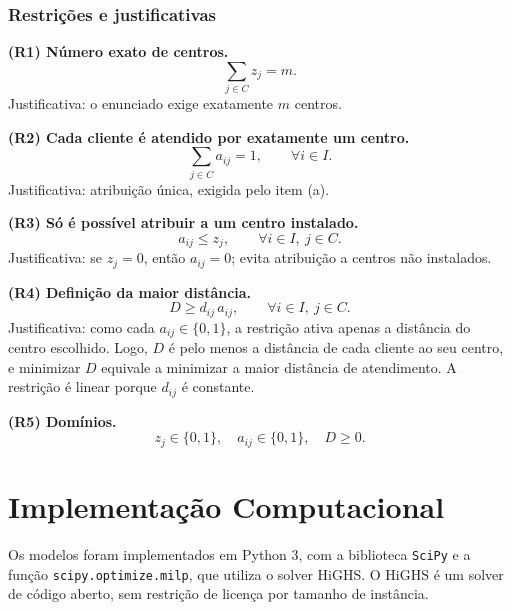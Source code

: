 \documentclass[12pt,a4paper]{article}
\begin{document}
\subsubsection*{Restrições e justificativas}

\textbf{(R1) Número exato de centros.}
\begin{equation}
\sum_{j\in C} z_j = m.
\end{equation}
Justificativa: o enunciado exige exatamente $m$ centros.

\textbf{(R2) Cada cliente é atendido por exatamente um centro.}
\begin{equation}
\sum_{j\in C} a_{ij} = 1, \qquad \forall i\in I.
\end{equation}
Justificativa: atribuição única, exigida pelo item (a).

\textbf{(R3) Só é possível atribuir a um centro instalado.}
\begin{equation}
a_{ij} \le z_j, \qquad \forall i\in I,\ j\in C.
\end{equation}
Justificativa: se $z_j=0$, então $a_{ij}=0$; evita atribuição
a centros não instalados.

\textbf{(R4) Definição da maior distância.}
\begin{equation}
D \ge d_{ij}\, a_{ij}, \qquad \forall i\in I,\ j\in C.
\end{equation}
Justificativa: como cada $a_{ij}\in\{0,1\}$, a restrição ativa
apenas a distância do centro escolhido. Logo, $D$ é pelo menos
a distância de cada cliente ao seu centro, e minimizar $D$
equivale a minimizar a maior distância de atendimento. A
restrição é linear porque $d_{ij}$ é constante.

\textbf{(R5) Domínios.}
\begin{equation}
z_j\in\{0,1\},\quad a_{ij}\in\{0,1\},\quad D\ge 0.
\end{equation}

\section{Implementação Computacional}

Os modelos foram implementados em Python 3, com a biblioteca
\texttt{SciPy} e a função \texttt{scipy.optimize.milp}, que
utiliza o solver HiGHS. O HiGHS é um solver de código aberto,
sem restrição de licença por tamanho de instância.
\end{document}
